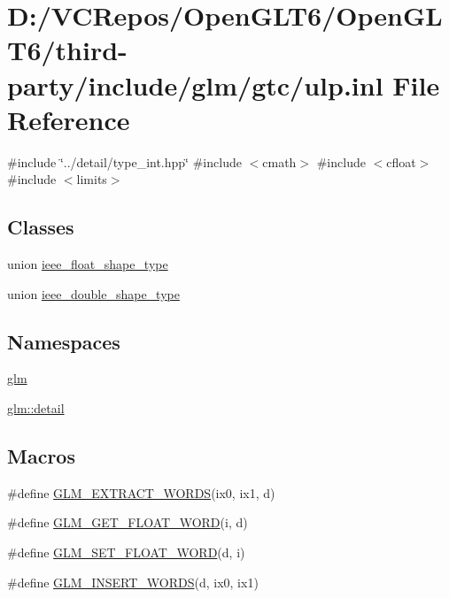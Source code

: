 \hypertarget{ulp_8inl}{}\section{D\+:/\+V\+C\+Repos/\+Open\+G\+L\+T6/\+Open\+G\+L\+T6/third-\/party/include/glm/gtc/ulp.inl File Reference}
\label{ulp_8inl}
{\ttfamily \#include \char`\"{}../detail/type\+\_\+int.\+hpp\char`\"{}}\newline
{\ttfamily \#include $<$cmath$>$}\newline
{\ttfamily \#include $<$cfloat$>$}\newline
{\ttfamily \#include $<$limits$>$}\newline
\subsection*{Classes}
\begin{DoxyCompactItemize}
\item 
union \mbox{\hyperlink{unionieee__float__shape__type}{ieee\+\_\+float\+\_\+shape\+\_\+type}}
\item 
union \mbox{\hyperlink{unionieee__double__shape__type}{ieee\+\_\+double\+\_\+shape\+\_\+type}}
\end{DoxyCompactItemize}
\subsection*{Namespaces}
\begin{DoxyCompactItemize}
\item 
 \mbox{\hyperlink{namespaceglm}{glm}}
\item 
 \mbox{\hyperlink{namespaceglm_1_1detail}{glm\+::detail}}
\end{DoxyCompactItemize}
\subsection*{Macros}
\begin{DoxyCompactItemize}
\item 
\#define \mbox{\hyperlink{ulp_8inl_a037d712bb7eec79dcd0073eb07d3f3e8}{G\+L\+M\+\_\+\+E\+X\+T\+R\+A\+C\+T\+\_\+\+W\+O\+R\+DS}}(ix0,  ix1,  d)
\item 
\#define \mbox{\hyperlink{ulp_8inl_a28d9056369280955e923f99180ccb23c}{G\+L\+M\+\_\+\+G\+E\+T\+\_\+\+F\+L\+O\+A\+T\+\_\+\+W\+O\+RD}}(i,  d)
\item 
\#define \mbox{\hyperlink{ulp_8inl_ab01ab8df0632f4a5f05e00f570e6b873}{G\+L\+M\+\_\+\+S\+E\+T\+\_\+\+F\+L\+O\+A\+T\+\_\+\+W\+O\+RD}}(d,  i)
\item 
\#define \mbox{\hyperlink{ulp_8inl_ac4ec14cb5c94f0ca1d594457ee17636f}{G\+L\+M\+\_\+\+I\+N\+S\+E\+R\+T\+\_\+\+W\+O\+R\+DS}}(d,  ix0,  ix1)
\end{DoxyCompactItemize}

